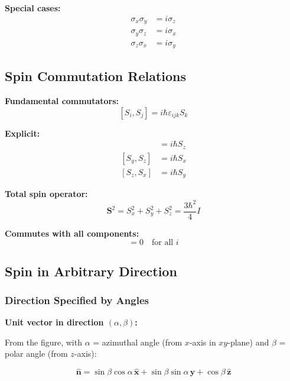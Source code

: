 \documentclass[11pt,a4paper]{article}
\begin{document}
\textbf{Special cases:}
\begin{align}
\sigma_x\sigma_y &= i\sigma_z \tag{S.15a} \\
\sigma_y\sigma_z &= i\sigma_x \tag{S.15b} \\
\sigma_z\sigma_x &= i\sigma_y \tag{S.15c}
\end{align}

\subsection{Spin Commutation Relations}

\textbf{Fundamental commutators:}
\begin{equation}
\boxed{[S_i, S_j] = i\hbar\varepsilon_{ijk}S_k}
\tag{S.16}
\end{equation}

\textbf{Explicit:}
\begin{align}
[S_x, S_y] &= i\hbar S_z \tag{S.17a} \\
[S_y, S_z] &= i\hbar S_x \tag{S.17b} \\
[S_z, S_x] &= i\hbar S_y \tag{S.17c}
\end{align}

\textbf{Total spin operator:}
\begin{equation}
\mathbf{S}^2 = S_x^2 + S_y^2 + S_z^2 = \frac{3\hbar^2}{4}I
\tag{S.18}
\end{equation}

\textbf{Commutes with all components:}
\begin{equation}
[\mathbf{S}^2, S_i] = 0 \quad \text{for all } i
\tag{S.19}
\end{equation}

\subsection{Spin in Arbitrary Direction}

\subsubsection{Direction Specified by Angles}

\textbf{Unit vector in direction $(\alpha, \beta)$:}

From the figure, with $\alpha$ = azimuthal angle (from $x$-axis in $xy$-plane) and $\beta$ = polar angle (from $z$-axis):

\begin{equation}
\boxed{\hat{\mathbf{n}} = \sin\beta\cos\alpha\,\hat{\mathbf{x}} + \sin\beta\sin\alpha\,\hat{\mathbf{y}} + \cos\beta\,\hat{\mathbf{z}}}
\tag{S.20}
\end{equation}
\end{document}
